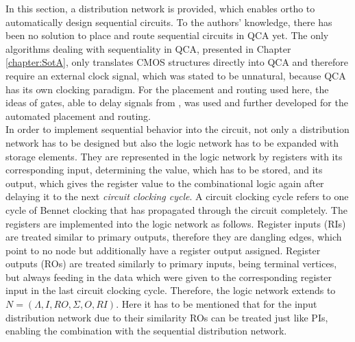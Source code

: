 In this section, a distribution network is provided, which enables ortho to automatically design sequential circuits. To the authors' knowledge, there has been no solution to place and route sequential circuits in QCA yet. The only algorithms dealing with sequentiality in QCA, presented in Chapter \ref{chapter:SotA}, only translates CMOS structures directly into QCA and therefore require an external clock signal, which was stated to be unnatural, because QCA has its own clocking paradigm. For the placement and routing used here, the ideas of gates, able to delay signals from \cite{Walter}, was used and further developed for the automated placement and routing.\\
In order to implement sequential behavior into the circuit, not only a distribution network has to be designed but also the logic network has to be expanded with storage elements. They are represented in the logic network by registers with its corresponding input, determining the value, which has to be stored, and its output, which gives the register value to the combinational logic again after delaying it to the next \textit{circuit clocking cycle}. A circuit clocking cycle refers to one cycle of Bennet clocking that has propagated through the circuit completely. The registers are implemented into the logic network as follows. Register inputs (RIs) are treated similar to primary outputs, therefore they are dangling edges, which point to no node but additionally have a register output assigned. Register outputs (ROs) are treated similarly to primary inputs, being terminal vertices, but always feeding in the data which were given to the corresponding register input in the last circuit clocking cycle. Therefore, the logic network extends to $N = (\Lambda, I, RO, \Sigma, O, RI)$. Here it has to be mentioned that for the input distribution network due to their similarity ROs can be treated just like PIs, enabling the combination with the sequential distribution network.
